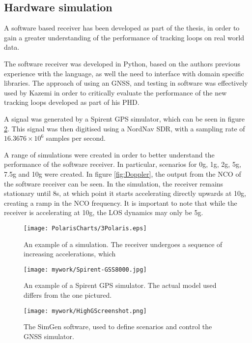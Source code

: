 \subsection{Hardware simulation}
A software based receiver has been developed as part of the thesis, in order to gain a greater understanding of the performance of tracking loops on real world data. 

The software receiver was developed in Python, based on the authors previous experience with the language, as well the need to interface with domain specific libraries. 
The approach of using an \ac{GNSS}, and testing in software was effectively used by Kazemi \cite{KazemiPHD} in order to critically evaluate the performance of the new tracking loops developed as part of his PHD.

A signal was generated by a Spirent \ac{GPS} simulator, which can be seen in figure \ref{fig:Spirent}. This signal was then digitised using a NordNav \ac{SDR}, with a sampling rate of $16.3676 \times 10^6$ samples per second. 

A range of simulations were created in order to better understand the performance of the software receiver. In particular, scenarios for 0g, 1g, 2g, 5g, 7.5g and 10g were created. In figure \ref{fig:Doppler}, the output from the \ac{NCO} of the software receiver can be seen. In the simulation, the receiver remains stationary until 8s, at which point it starts accelerating directly upwards at 10g, creating a ramp in the \ac{NCO} frequency. It is important to note that while the receiver is accelerating at 10g, the \ac{LOS} dynamics may only be 5g. 

\begin{figure}[!htb] 
    \centering
    \texttt{[image: PolarisCharts/3Polaris.eps]} 
    \caption{An example of a simulation. The receiver undergoes a sequence of increasing accelerations, which }
    \label{fig:Polaris3}
\end{figure}


\begin{figure}[!htb] 
    \centering
    \texttt{[image: mywork/Spirent-GSS8000.jpg]} 
    \caption{An example of a Spirent \ac{GPS} simulator. The actual model used differs from the one pictured.}
    \label{fig:Spirent}
\end{figure}

\begin{figure}[!htb] 
    \centering
    \texttt{[image: mywork/HighGScreenshot.png]} 
    \caption{The SimGen software, used to define scenarios and control the \ac{GNSS} simulator.}
    \label{fig:HighGScreenshot}
\end{figure}


